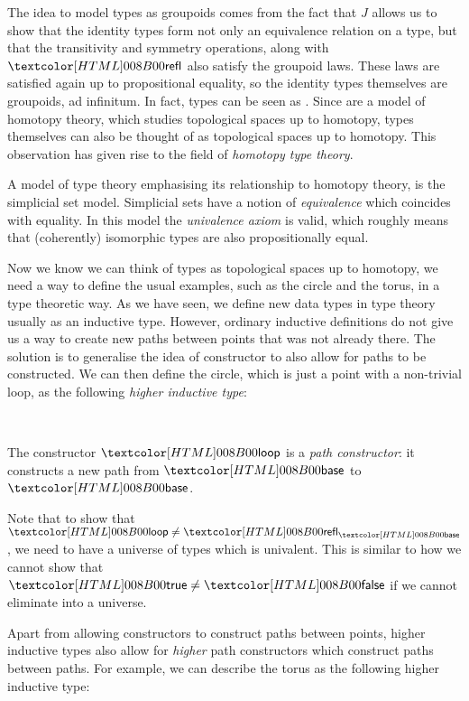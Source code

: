 The idea to model types as groupoids comes from the fact that $J$
allows us to show that the identity types form not only an equivalence
relation on a type, but that the transitivity and symmetry operations,
along with $\refl$ also satisfy the groupoid laws. These laws are
satisfied again up to propositional equality, so the identity types
themselves are groupoids, ad infinitum. In fact, types can be seen as
\inftygrpds. Since \inftygrpds are a model of homotopy theory, which
studies topological spaces up to homotopy, types themselves can also
be thought of as topological spaces up to homotopy. This observation
has given rise to the field of \emph{homotopy type theory}.

A model of type theory emphasising its relationship to homotopy
theory, is the simplicial set model. Simplicial sets have a notion of
\emph{equivalence} which coincides with equality. In this model the
\emph{univalence axiom} is valid, which roughly means that
(coherently) isomorphic types are also propositionally equal.

Now we know we can think of types as topological spaces up to
homotopy, we need a way to define the usual examples, such as the
circle and the torus, in a type theoretic way. As we have seen, we
define new data types in type theory usually as an inductive
type. However, ordinary inductive definitions do not give us a way to
create new paths between points that was not already there. The
solution is to generalise the idea of constructor to also allow for
paths to be constructed. We can then define the circle, which is just
a point with a non-trivial loop, as the following \emph{higher
  inductive type}:
\begin{datatype}{\circlety}{\Type}
  \constr{\circlebase}{\circlety} \\
  \constr{\circleloop}{\circlebase = \circlebase}
\end{datatype}
The constructor $\circleloop$ is a \emph{path constructor}: it
constructs a new path from $\circlebase$ to $\circlebase$. 


Note that to show that $\circleloop \neq \refl_{\circlebase}$, we need
to have a universe of types which is univalent. This is similar to how
we cannot show that $\booltrue \neq \boolfalse$ if we cannot eliminate into a
universe.

Apart from allowing constructors to construct paths between points,
higher inductive types also allow for \emph{higher} path constructors
which construct paths between paths. For example, we can describe the
torus as the following higher inductive type:
\begin{datatype}{\torusty}{\Type}
  \constr{\torusbase}{\torusty} \\
  \constr{\torusp}{\torusbase = \torusbase} \\
  \constr{\torusq}{\torusbase = \torusbase} \\
  \constr{\torusr}{\torusp \ct \torusq = \torusq \ct \torusp}
\end{datatype}

